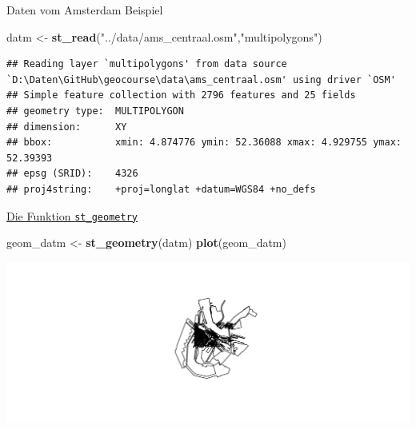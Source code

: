 \documentclass[ignorenonframetext,]{beamer}
\newenvironment{Shaded}{\begin{snugshade}}{\end{snugshade}}
\newcommand{\KeywordTok}[1]{\textcolor[rgb]{0.13,0.29,0.53}{\textbf{#1}}}
\newcommand{\StringTok}[1]{\textcolor[rgb]{0.31,0.60,0.02}{#1}}
\newcommand{\NormalTok}[1]{#1}
\begin{document}
\begin{frame}[fragile]{Daten vom Amsterdam Beispiel}

\begin{Shaded}
\begin{Highlighting}[]
\NormalTok{datm <-}\StringTok{ }\KeywordTok{st_read}\NormalTok{(}\StringTok{"../data/ams_centraal.osm"}\NormalTok{,}\StringTok{"multipolygons"}\NormalTok{)}
\end{Highlighting}
\end{Shaded}

\begin{verbatim}
## Reading layer `multipolygons' from data source `D:\Daten\GitHub\geocourse\data\ams_centraal.osm' using driver `OSM'
## Simple feature collection with 2796 features and 25 fields
## geometry type:  MULTIPOLYGON
## dimension:      XY
## bbox:           xmin: 4.874776 ymin: 52.36088 xmax: 4.929755 ymax: 52.39393
## epsg (SRID):    4326
## proj4string:    +proj=longlat +datum=WGS84 +no_defs
\end{verbatim}

\end{frame}

\begin{frame}[fragile]{\href{https://cran.r-project.org/web/packages/sf/vignettes/sf3.html}{Die
Funktion \texttt{st\_geometry}}}

\begin{Shaded}
\begin{Highlighting}[]
\NormalTok{geom_datm <-}\StringTok{ }\KeywordTok{st_geometry}\NormalTok{(datm)}
\KeywordTok{plot}\NormalTok{(geom_datm)}
\end{Highlighting}
\end{Shaded}

\includegraphics{slides_all2gether_part2_files/figure-beamer/unnamed-chunk-197-1.pdf}

\end{frame}
\end{document}
